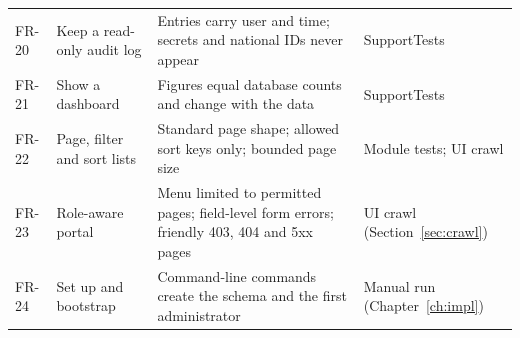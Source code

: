 \begin{longtable}{@{}p{1.1cm}p{5.4cm}p{5.8cm}p{2.4cm}@{}}
FR-20 & Keep a read-only audit log & Entries carry user and time; secrets and national IDs never appear & Support\allowbreak{}Tests\\
FR-21 & Show a dashboard & Figures equal database counts and change with the data & Support\allowbreak{}Tests\\
FR-22 & Page, filter and sort lists & Standard page shape; allowed sort keys only; bounded page size & Module tests; UI crawl\\
FR-23 & Role-aware portal & Menu limited to permitted pages; field-level form errors; friendly 403, 404 and 5xx pages & UI crawl (Section~\ref{sec:crawl})\\
FR-24 & Set up and bootstrap & Command-line commands create the schema and the first administrator & Manual run (Chapter~\ref{ch:impl})\\
\end{longtable}
\endgroup

